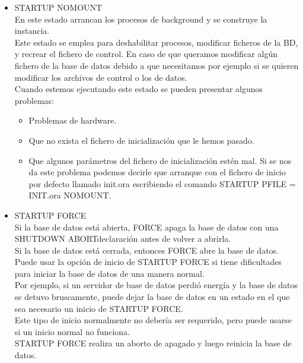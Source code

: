 \begin{itemize}
\begin{itemize}
		\end{itemize}
	\item STARTUP NOMOUNT
	\\En este estado arrancan los procesos de background y se construye la instancia.
	\\Este estado se emplea para deshabilitar procesos, modificar ficheros de la BD, y recrear el
	fichero de control. En caso de que queramos modificar algún fichero de la base de datos debido a
	que necesitamos por ejemplo si se quieren modificar los archivos de control o los de datos.
	\\Cuando estemos ejecutando este estado se pueden presentar algunos problemas:		
		\begin{itemize}
			\item Problemas de hardware.
			\item Que no exista el fichero de inicialización que le hemos pasado.
			\item Que algunos parámetros del fichero de inicialización estén mal. Si se nos da este
			problema podemos decirle que arranque con el fichero de inicio por defecto llamado	
			init.ora escribiendo el comando STARTUP PFILE = INIT.ora NOMOUNT.			
		\end{itemize}
	\item STARTUP FORCE
	\\Si la base de datos está abierta, FORCE apaga la base de datos con una SHUTDOWN ABORTdeclaración antes de volver a abrirla. 
	\\Si la base de datos está cerrada, entonces FORCE  abre la base de datos.
	\\Puede usar la opción de inicio de STARTUP FORCE si tiene dificultades para iniciar la base de datos de una manera normal. 
	\\Por ejemplo, si un servidor de base de datos perdió energía y la base de datos se detuvo bruscamente, puede dejar la base de datos en un estado en 		el que sea necesario un inicio de STARTUP FORCE. 
	\\Este tipo de inicio normalmente no debería ser requerido, pero puede usarse si un inicio normal no funciona. 
	\\STARTUP FORCE realiza un aborto de apagado y luego reinicia la base de datos.
\end{itemize} 